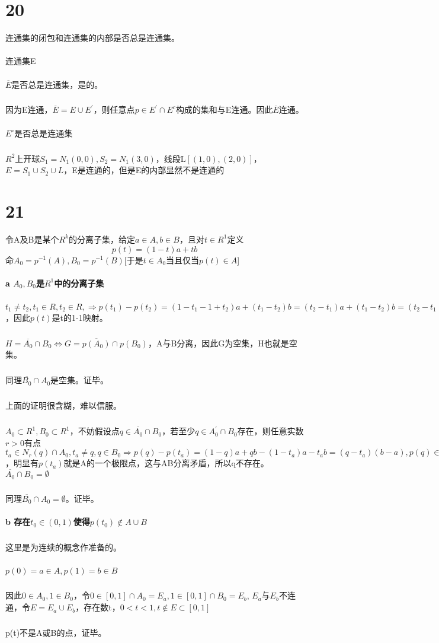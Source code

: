 \section*{20} 连通集的闭包和连通集的内部是否总是连通集。
\paragraph{} 连通集E
\paragraph{} $\overline{E}$是否总是连通集，是的。
\subparagraph{} 因为E连通，$\overline{E}= E \cup E^{'}$，则任意点$p\in E^{'}\cap E^c$构成的集和与E连通。因此$\overline{E}$连通。
\paragraph{} $E^{\circ}$是否总是连通集
\subparagraph{} $R^2$上开球$S_1 = N_1(0,0), S_2 = N_1(3,0)$，线段L$[(1,0), (2,0)]$，$E = S_1 \cup S_2 \cup L$，E是连通的，但是E的内部显然不是连通的
\section*{21} 令A及B是某个$R^k$的分离子集，给定$a \in A, b \in B$，且对$t \in R^1$定义$$p(t) = (1 - t)a + tb$$命$A_0=p^{-1}(A), B_0=p^{-1}(B)$[于是$t \in A_0$当且仅当$p(t) \in A$]
\paragraph{a $A_0,B_0$是$R^1$中的分离子集}
\subparagraph{} $t_1 \ne t_2, t_1 \in R, t_2 \in R, \Rightarrow p(t_1) - p(t_2) = (1-t_1 -1 + t_2)a + (t_1 - t_2)b = (t_2-t_1)a + (t_1 - t_2)b = (t_2-t_1)(a - b) \ne 0$，因此$p(t)$是t的1-1映射。
\subparagraph{} $H = \overline{A_0} \cap B_0 \iff G= \overline{p(A_0)} \cap p(B_0)$，A与B分离，因此G为空集，H也就是空集。
\subparagraph{} 同理$\overline{B_0} \cap A_0$是空集。证毕。
\subparagraph{} 上面的证明很含糊，难以信服。
\subparagraph{} $A_0 \subset R^1, B_0 \subset R^1$，不妨假设点$q \in \overline{A_0} \cap B_0$，若至少$ q \in  A_0^{'} \cap B_0$存在，则任意实数$r>0$有点$t_a \in N_r(q) \cap A_0, t_a \ne q, q \in B_0 \Rightarrow p(q) - p(t_a) = (1-q)a+qb - (1-t_a)a-t_ab = (q - t_a)(b - a), p(q) \in A, p(t_a) \in B$，明显有$p(t_a)$就是A的一个极限点，这与AB分离矛盾，所以q不存在。$ \overline{A_0} \cap B_0 = \emptyset $
\subparagraph{} 同理$\overline{B_0} \cap A_0 = \emptyset$。证毕。
\paragraph{b 存在$t_0\in(0, 1)$使得$p(t_0) \notin A\cup B$}
\subparagraph{} 这里是为连续的概念作准备的。
\subparagraph{} $p(0) = a \in A, p(1) = b \in B$
\subparagraph{} 因此$ 0 \in A_0, 1 \in B_0$，令$0 \in [0,1] \cap A_0 = E_a, 1 \in [0,1] \cap B_0 = E_b$, $E_a$与$E_b$不连通，令$E=E_a \cup E_b$，存在数t，$0 < t < 1, t\notin E \subset [0, 1]$
\subparagraph{} p(t)不是A或B的点，证毕。
